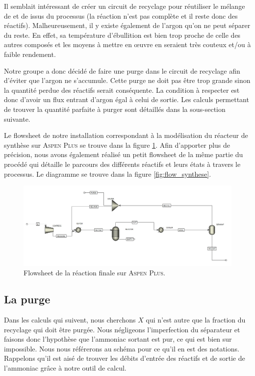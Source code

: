 Il semblait intéressant de créer un circuit de recyclage pour réutiliser 
le mélange de  et de  issus du processus (la réaction n'est pas complète 
et il reste donc des réactifs). Malheureusement, il y existe également de l'argon 
qu'on ne peut séparer du reste. En effet, sa température d'ébullition est bien trop 
proche de celle des autres composés et les moyens à mettre en œuvre en seraient 
très couteux et/ou à faible rendement.

Notre groupe a donc décidé de faire une purge dans le circuit de recyclage afin d'éviter que l'argon ne s'accumule. Cette purge ne doit pas être trop grande sinon la quantité perdue des réactifs serait conséquente. 
La condition à respecter est donc d'avoir un flux entrant d'argon égal à celui de sortie. 
Les calculs permettant de trouver la quantité parfaite à purger 
sont détaillés dans la sous-section suivante.

Le flowsheet de notre installation correspondant à la modélisation 
du réacteur de synthèse sur \textsc{Aspen Plus} 
se trouve dans la figure \ref{fig:flow_aspen}.
Afin d'apporter plus de précision, nous avons également réalisé un petit 
flowsheet de la même partie du procédé qui détaille le parcours des 
différents réactifs et leurs états à travers le processus.
Le diagramme se trouve dans la figure \ref{fig:flow_synthese}.

\begin{figure}[h!]
	\begin{center}
		\includegraphics[scale=0.45,angle=90]{img_aspen/flowsheet.jpg}
	\end{center}
	\caption{Flowsheet de la réaction finale sur \textsc{Aspen Plus}.}
	\label{fig:flow_aspen}
\end{figure}

\subsection{La purge}

Dans les calculs qui suivent, nous cherchons $X$ qui n'est autre que 
la fraction du recyclage qui doit être purgée. 
Nous négligeons l'imperfection du séparateur et faisons donc l'hypothèse 
que l'ammoniac sortant est pur, ce qui est bien sur impossible. 
Nous nous référerons au schéma pour ce qu'il en est des notations. 
Rappelons qu'il est aisé de trouver les débits d'entrée des réactifs 
et de sortie de l'ammoniac grâce à notre outil de calcul.

